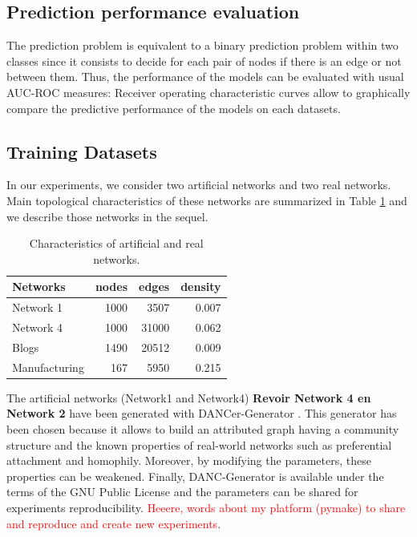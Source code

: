 \subsection{Prediction performance evaluation}
The prediction problem is equivalent to a binary prediction problem within two classes since it consists to decide for each pair of nodes if there is an edge or not between them. 
Thus, the performance of the models can be evaluated with usual AUC-ROC measures: Receiver operating characteristic curves allow to graphically compare the predictive performance of the models on each datasets.

\subsection{Training Datasets}

In our experiments, we consider two artificial networks and two real networks.  Main topological characteristics of these networks are summarized in Table \ref{table:networks_measures} and we describe those networks in the sequel.

\begin{table}[h] 
	\centering
	\caption{Characteristics of artificial and real networks.}
    \begin{tabular}{lrrr}
        \hline
        \textbf{Networks} &   nodes &   edges &   density \\
        \hline
        Network 1 &    1000 &    3507 &     0.007 \\
        Network 4 &    1000 &   31000 &     0.062 \\
        Blogs         &    1490 &   20512 &     0.009 \\
        Manufacturing &     167 &    5950 &     0.215 \\
    \hline
    \end{tabular}
	\label{table:networks_measures}
\end{table}

The artificial networks (Network1 and Network4) \textbf{Revoir Network 4 en Network 2} have been generated with DANCer-Generator \cite{largeron2015}. This generator has been chosen because it allows to build an attributed graph having a community structure  and  the known properties of real-world networks such as preferential attachment and homophily.
Moreover, by modifying the parameters, these properties can be weakened. Finally, DANC-Generator is available under the terms of the GNU Public License and the parameters can be shared for experiments reproducibility. \textcolor{red}{Heeere, words about my platform (pymake) to share and reproduce and create new experiments}.

